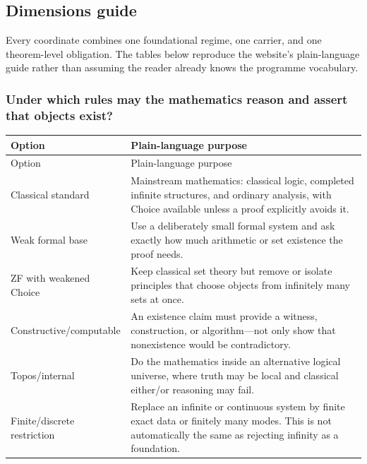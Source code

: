 \subsection{Dimensions guide}
\label{app:dimensions-guide}
Every coordinate combines one foundational regime, one carrier, and one theorem-level obligation.  The tables below reproduce the website's plain-language guide rather than assuming the reader already knows the programme vocabulary.

\subsubsection{Under which rules may the mathematics reason and assert that objects exist?}
\begingroup
\small
\begin{longtable}{@{}p{}p{}@{}}
\toprule
Option & Plain-language purpose \\
\midrule
\endfirsthead
\toprule
Option & Plain-language purpose \\
\midrule
\endhead
Classical standard & Mainstream mathematics: classical logic, completed infinite structures, and ordinary analysis, with Choice available unless a proof explicitly avoids it. \\
Weak formal base & Use a deliberately small formal system and ask exactly how much arithmetic or set existence the proof needs. \\
ZF with weakened Choice & Keep classical set theory but remove or isolate principles that choose objects from infinitely many sets at once. \\
Constructive/computable & An existence claim must provide a witness, construction, or algorithm---not only show that nonexistence would be contradictory. \\
Topos/internal & Do the mathematics inside an alternative logical universe, where truth may be local and classical either/or reasoning may fail. \\
Finite/discrete restriction & Replace an infinite or continuous system by finite exact data or finitely many modes. This is not automatically the same as rejecting infinity as a foundation. \\
\bottomrule
\end{longtable}
\endgroup

